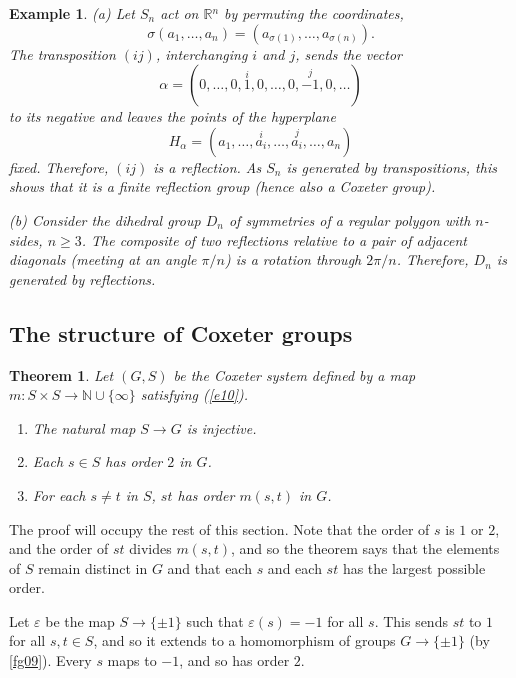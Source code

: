 \documentclass[a4paper,11pt,final,openany]{memoir}%
\newtheorem{theorem}[X]{Theorem}
\newtheorem{example}[X]{Example}
\theoremstyle{nonumberplain}
\begin{document}
\begin{example}
\label{fg15}(a) Let $S_{n}$ act on $\mathbb{R}{}^{n}$ by permuting the
coordinates,%
\[
\sigma(a_{1},\ldots,a_{n})=(a_{\sigma(1)},\ldots,a_{\sigma(n)}).
\]
The transposition $(ij)$, interchanging $i$ and $j$, sends the vector%
\[
\alpha=(0,\ldots,0,\overset{i}{1},0,\ldots,0,\overset{j}{-1},0,\ldots)
\]
to its negative and leaves the points of the hyperplane%
\[
H_{\alpha}=(a_{1},\ldots,\overset{i}{a_{i}},\ldots,\overset{j}{a_{i}}%
,\ldots,a_{n})
\]
fixed. Therefore, $(ij)$ is a reflection. As $S_{n}$ is generated by
transpositions, this shows that it is a finite reflection group (hence also a
Coxeter group).

(b) Consider the dihedral group $D_{n}$ of symmetries of a regular polygon
with $n$-sides, $n\geq3$. The composite of two reflections relative to a pair
of adjacent diagonals (meeting at an angle $\pi/n$) is a rotation through
$2\pi/n$. Therefore, $D_{n}$ is generated by reflections.
\end{example}

\subsection{The structure of Coxeter groups}

\begin{theorem}
\label{fg16}%
%
Let $(G,S)$ be the Coxeter system defined by a map $m\colon S\times
S\rightarrow\mathbb{N}{}\cup\{\infty\}$ satisfying (\ref{e10}).

\begin{enumerate}
\item The natural map $S\rightarrow G$ is injective.

\item Each $s\in S$ has order $2$ in $G$.

\item For each $s\neq t$ in $S$, $st$ has order $m(s,t)$ in $G$.
\end{enumerate}
\end{theorem}

The proof will occupy the rest of this section. Note that the order of $s$ is
$1$ or $2$, and the order of $st$ divides $m(s,t)$, and so the theorem says
that the elements of $S$ remain distinct in $G$ and that each $s$ and each
$st$ has the largest possible order.

Let $\varepsilon$ be the map $S\rightarrow\{\pm1\}$ such that $\varepsilon
(s)=-1$ for all $s$. This sends $st$ to $1$ for all $s,t\in S$, and so it
extends to a homomorphism of groups $G\rightarrow\{\pm1\}$ (by \ref{fg09}).
Every $s$ maps to $-1$, and so has order $2$.
\end{document}
